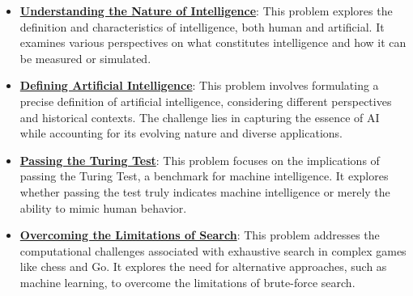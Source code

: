 \documentclass{article}%
\begin{document}
\begin{itemize}[leftmargin=*]%
\item \href{https://purdue.brightspace.com/d2l/common/assets/pdfjs-d2l-dist/1.0.14-legacy/web/viewer.html?file=\%2Fcontent\%2Fenforced\%2F1095467-wl.202510.CS.24300.001\%2F02L2-Intro.pdf\%3Fou\%3D1095467\&lang=en-us\&container=d2l-fileviewer-rendered-pdf\&fullscreen=d2l-fileviewer-rendered-pdf-dialog\&height=667#page=5}{\textbf{Understanding the Nature of Intelligence}}: This problem explores the definition and characteristics of intelligence, both human and artificial. It examines various perspectives on what constitutes intelligence and how it can be measured or simulated.%
\item \href{https://purdue.brightspace.com/d2l/common/assets/pdfjs-d2l-dist/1.0.14-legacy/web/viewer.html?file=\%2Fcontent\%2Fenforced\%2F1095467-wl.202510.CS.24300.001\%2F02L2-Intro.pdf\%3Fou\%3D1095467\&lang=en-us\&container=d2l-fileviewer-rendered-pdf\&fullscreen=d2l-fileviewer-rendered-pdf-dialog\&height=667#page=5}{\textbf{Defining Artificial Intelligence}}: This problem involves formulating a precise definition of artificial intelligence, considering different perspectives and historical contexts. The challenge lies in capturing the essence of AI while accounting for its evolving nature and diverse applications.%
\item \href{https://purdue.brightspace.com/d2l/common/assets/pdfjs-d2l-dist/1.0.14-legacy/web/viewer.html?file=\%2Fcontent\%2Fenforced\%2F1095467-wl.202510.CS.24300.001\%2F02L2-Intro.pdf\%3Fou\%3D1095467\&lang=en-us\&container=d2l-fileviewer-rendered-pdf\&fullscreen=d2l-fileviewer-rendered-pdf-dialog\&height=667#page=6}{\textbf{Passing the Turing Test}}: This problem focuses on the implications of passing the Turing Test, a benchmark for machine intelligence. It explores whether passing the test truly indicates machine intelligence or merely the ability to mimic human behavior.%
\item \href{https://purdue.brightspace.com/d2l/common/assets/pdfjs-d2l-dist/1.0.14-legacy/web/viewer.html?file=\%2Fcontent\%2Fenforced\%2F1095467-wl.202510.CS.24300.001\%2F02L2-Intro.pdf\%3Fou\%3D1095467\&lang=en-us\&container=d2l-fileviewer-rendered-pdf\&fullscreen=d2l-fileviewer-rendered-pdf-dialog\&height=667#page=11}{\textbf{Overcoming the Limitations of Search}}: This problem addresses the computational challenges associated with exhaustive search in complex games like chess and Go. It explores the need for alternative approaches, such as machine learning, to overcome the limitations of brute{-}force search.%

\end{itemize}
\end{document}

